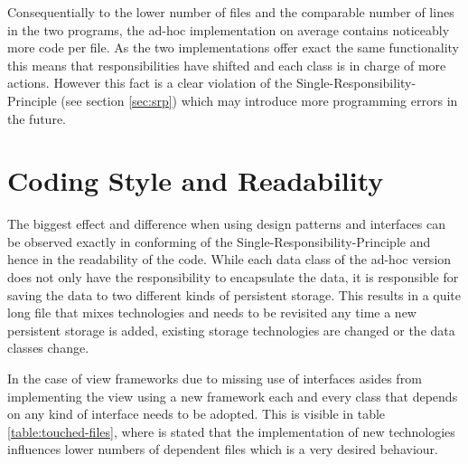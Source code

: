 Consequentially to the lower number of files and the comparable number of lines in the two programs, the ad-hoc implementation on average contains noticeably more code per file. As the two implementations offer exact the same functionality this means that responsibilities have shifted and each class is in charge of more actions. However this fact is a clear violation of the Single-Responsibility-Principle (see section \ref{sec:srp}) which may introduce more programming errors in the future. 

\section{Coding Style and Readability}
The biggest effect and difference when using design patterns and interfaces can be observed exactly in conforming of the Single-Responsibility-Principle and hence in the readability of the code. While each data class of the ad-hoc version does not only have the responsibility to encapsulate the data, it is responsible for saving the data to two different kinds of persistent storage. This results in a quite long file that mixes technologies and needs to be revisited any time a new persistent storage is added, existing storage technologies are changed or the data classes change. 

In the case of view frameworks due to missing use of interfaces asides from implementing the view using a new framework each and every class that depends on any kind of interface needs to be adopted. This is visible in table \ref{table:touched-files}, where is stated that the implementation of new technologies influences lower numbers of dependent files which is a very desired behaviour. 